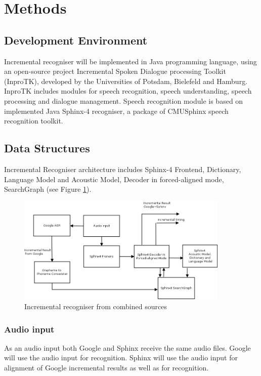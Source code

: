 \section {Methods}
\subsection {Development Environment}
Incremental recogniser will be implemented in Java programming language, using
an open-source project Incremental Spoken Dialogue processing
Toolkit (InproTK), developed by the Universities of Potsdam, Bielefeld and
Hamburg. InproTK includes modules for speech recognition, speech understanding,
speech processing and dialogue management.
Speech recognition module is based on implemented Java Sphinx-4 recogniser, a
package of CMUSphinx speech recognition toolkit. 

\subsection {Data Structures}
Incremental Recogniser architecture includes Sphinx-4 Frontend, Dictionary,
Language Model and Acoustic Model, Decoder in forced-aligned mode,
SearchGraph (see Figure \ref {fig:Bild1}).
\begin{center}
\begin{figure}[htbp]
  \centering
     \includegraphics[width=0.9\textwidth]{images/overview.png}
  \caption{Incremental recogniser from combined sources}
  \label{fig:Bild1}
\end{figure}
\end {center}
\subsubsection {Audio input}
As an audio input both Google and Sphinx receive the same audio files. Google
will use the audio input for recognition. Sphinx will use the audio input
for alignment of Google incremental results as well as for recognition.  
